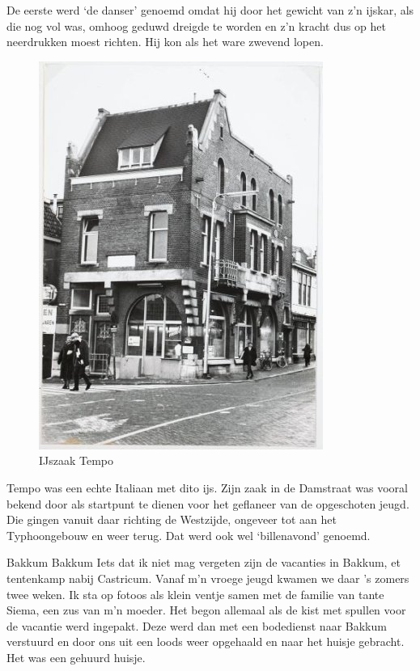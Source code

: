 \documentclass[10pt,twoside, openright]{memoir}
\begin{document}
De eerste werd `de danser' genoemd omdat hij door het gewicht van z’n ijskar, als die nog vol was, omhoog geduwd dreigde te worden en z’n kracht dus op het neerdrukken moest richten. Hij kon als het ware zwevend lopen. 

\begin{figure}
\includegraphics[width=\textwidth]{img/66tempo}
\caption*{\footnotesize IJszaak Tempo}
\end{figure}

Tempo was een echte Italiaan met dito ijs. Zijn zaak in de Damstraat was vooral bekend door als startpunt te dienen voor het geflaneer van de opgeschoten jeugd.  Die gingen vanuit daar richting de Westzijde, ongeveer tot aan het Typhoongebouw en weer terug. Dat werd ook wel ‘billenavond’ genoemd. 

Bakkum
Bakkum
Iets dat ik niet mag vergeten zijn de vacanties in Bakkum, et tentenkamp nabij Castricum. Vanaf m’n vroege jeugd kwamen we daar ’s zomers twee weken. Ik sta op fotoos als klein ventje samen met de familie van tante Siema, een zus van m’n moeder. Het begon allemaal als de kist met spullen voor de vacantie werd ingepakt. Deze werd dan met een bodedienst naar Bakkum verstuurd en door ons uit een loods weer opgehaald en naar het huisje gebracht. Het was een gehuurd huisje. 
\end{document}
